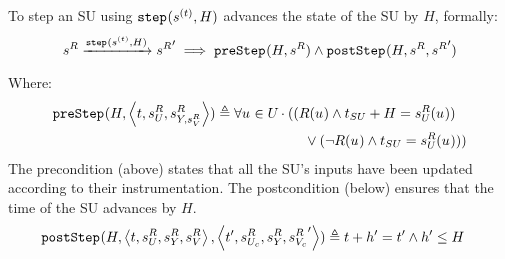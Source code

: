   \begin{definition}\label{def:step}
    To step an SU using $\mathtt{step}_{}(s_{}^{(t)}, H)$ advances the state of the SU by $H$, formally:
    \begin{align*}
      s^{R}_{} 
      \xrightarrow[\text{}]{\mathtt{step}_{}(s_{}^{(t)}, H)} 
      {s^{R}_{}}'
      \implies 
      \mathtt{preStep}_{}(H, s^{R}_{})
      \land
      \mathtt{postStep}_{}(H, s^{R}_{}, {s^{R}_{}}')
    \end{align*}
    Where:
    \begin{align*}
      &\mathtt{preStep}_{}(H,  \left\langle t,s^{R}_{U_{}}, s^{R}_{Y_{}, s^{R}_{V}} \right\rangle ) \triangleq 
      \forall u_{} \in U_{}
      \cdot 
      ((R(u_{}) \land t_{SU} + H = s^{R}_{U_{}}(u_{}))
      \nonumber \\
      &\qquad \qquad \qquad \qquad \qquad \qquad \qquad \qquad \qquad 
      \lor 
      (\neg R(u_{}) \land t_{SU} = s^{R}_{U_{}}(u_{})))
    \end{align*}
    The precondition (above) states that all the SU's inputs have been updated according to their instrumentation.  
    The postcondition (below) ensures that the time of the SU advances by $H$.
    \begin{align*}
      &\mathtt{postStep}_{}(H,  \left\langle t,s^{R}_{U_{}}, s^{R}_{Y_{}}, s^{R}_{V} \right\rangle ,  \left\langle t',s^{R}_{U_{c}}, s^{R}_{Y_{}}, {s^{R}_{V_c}}' \right\rangle ) \triangleq t + h' = t' \land h' \leq H
    \end{align*}
  \end{definition}

